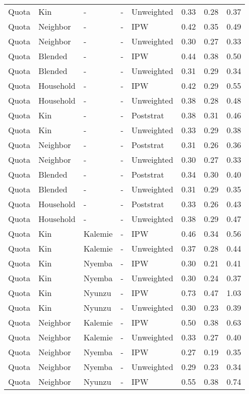 \begin{longtable}[t]{lllllrrr}
Quota & Kin & - & - & Unweighted & 0.33 & 0.28 & 0.37\\
Quota & Neighbor & - & - & IPW & 0.42 & 0.35 & 0.49\\
Quota & Neighbor & - & - & Unweighted & 0.30 & 0.27 & 0.33\\
\addlinespace
Quota & Blended & - & - & IPW & 0.44 & 0.38 & 0.50\\
Quota & Blended & - & - & Unweighted & 0.31 & 0.29 & 0.34\\
Quota & Household & - & - & IPW & 0.42 & 0.29 & 0.55\\
Quota & Household & - & - & Unweighted & 0.38 & 0.28 & 0.48\\
Quota & Kin & - & - & Poststrat & 0.38 & 0.31 & 0.46\\
\addlinespace
Quota & Kin & - & - & Unweighted & 0.33 & 0.29 & 0.38\\
Quota & Neighbor & - & - & Poststrat & 0.31 & 0.26 & 0.36\\
Quota & Neighbor & - & - & Unweighted & 0.30 & 0.27 & 0.33\\
Quota & Blended & - & - & Poststrat & 0.34 & 0.30 & 0.40\\
Quota & Blended & - & - & Unweighted & 0.31 & 0.29 & 0.35\\
\addlinespace
Quota & Household & - & - & Poststrat & 0.33 & 0.26 & 0.43\\
Quota & Household & - & - & Unweighted & 0.38 & 0.29 & 0.47\\
Quota & Kin & Kalemie & - & IPW & 0.46 & 0.34 & 0.56\\
Quota & Kin & Kalemie & - & Unweighted & 0.37 & 0.28 & 0.44\\
Quota & Kin & Nyemba & - & IPW & 0.30 & 0.21 & 0.41\\
\addlinespace
Quota & Kin & Nyemba & - & Unweighted & 0.30 & 0.24 & 0.37\\
Quota & Kin & Nyunzu & - & IPW & 0.73 & 0.47 & 1.03\\
Quota & Kin & Nyunzu & - & Unweighted & 0.30 & 0.23 & 0.39\\
Quota & Neighbor & Kalemie & - & IPW & 0.50 & 0.38 & 0.63\\
Quota & Neighbor & Kalemie & - & Unweighted & 0.33 & 0.27 & 0.40\\
\addlinespace
Quota & Neighbor & Nyemba & - & IPW & 0.27 & 0.19 & 0.35\\
Quota & Neighbor & Nyemba & - & Unweighted & 0.29 & 0.23 & 0.34\\
Quota & Neighbor & Nyunzu & - & IPW & 0.55 & 0.38 & 0.74\\

\end{longtable}
